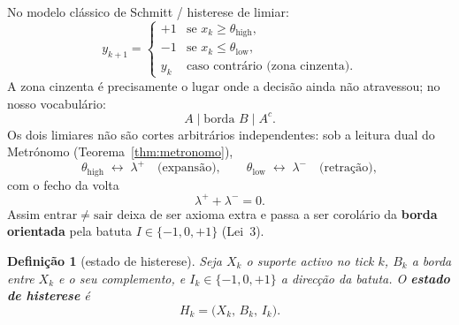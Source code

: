 \documentclass[11pt,a4paper]{article}
\newtheorem{definicao}{Definição}
\begin{document}
No modelo clássico de Schmitt / histerese de limiar:
\[
y_{k+1}
=
\begin{cases}
+1 & \text{se }x_k\geq\theta_{\mathrm{high}},\\
-1 & \text{se }x_k\leq\theta_{\mathrm{low}},\\
y_k & \text{caso contrário (zona cinzenta)}.
\end{cases}
\]
A zona cinzenta é precisamente o lugar onde a decisão ainda não
atravessou; no nosso vocabulário:
\[
\boxed{
A
\;|\;
\text{borda }B
\;|\;
A^{c}.
}
\]
Os dois limiares não são cortes arbitrários independentes: sob a
leitura dual do Metrónomo (Teorema~\ref{thm:metronomo}),
\[
\boxed{
\theta_{\mathrm{high}}\;\leftrightarrow\;\lambda^{+}
\quad\text{(expansão)},
\qquad
\theta_{\mathrm{low}}\;\leftrightarrow\;\lambda^{-}
\quad\text{(retração)},
}
\]
com o fecho da volta
\[
\boxed{\lambda^{+} + \lambda^{-} = 0}.
\]
Assim $\mathrm{entrar}\neq\mathrm{sair}$ deixa de ser axioma extra e
passa a ser corolário da \textbf{borda orientada} pela batuta
$I\in\{-1,0,+1\}$ (Lei~3).

\begin{definicao}[estado de histerese]\label{def:H-k}
Seja $X_k$ o suporte activo no tick $k$, $B_k$ a borda entre $X_k$ e o
seu complemento, e $I_k\in\{-1,0,+1\}$ a direcção da batuta. O
\textbf{estado de histerese} é
\[
\boxed{
H_k = \bigl(X_k,\,B_k,\,I_k\bigr).
}
\]
\end{definicao}
\end{document}
